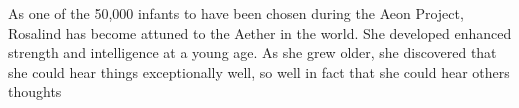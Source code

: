 \documentclass[12pt,titlepage]{article}
\begin{document}
As one of the 50,000 infants to have been chosen during the Aeon Project, 
Rosalind has become attuned to the Aether in the world. She developed enhanced 
strength and intelligence at a young age. As she grew older, she discovered that 
she could hear things exceptionally well, so well in fact that she could hear others 
thoughts










\end{document}
